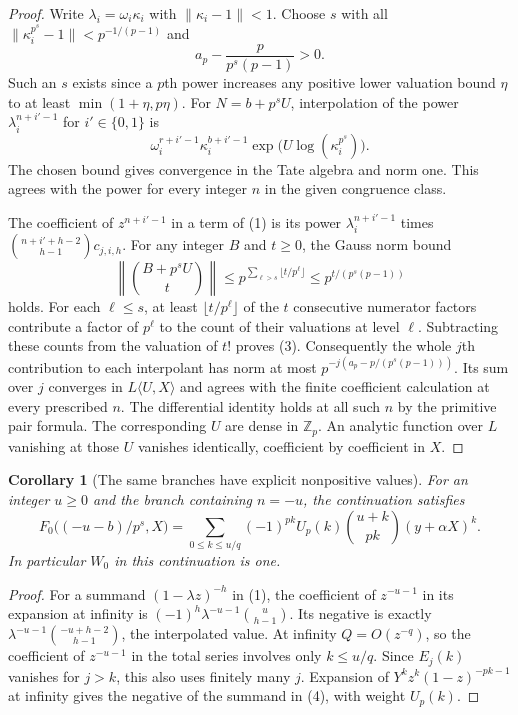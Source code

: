 \documentclass[11pt]{article}
\newtheorem{corollary}[theorem]{Corollary}
\begin{document}
\begin{proof}
Write $\lambda_i=\omega_i\kappa_i$ with $\|\kappa_i-1\|<1$.
Choose $s$ with all
$\|\kappa_i^{p^s}-1\|<p^{-1/(p-1)}$ and
\[
                  a_p-\frac{p}{p^s(p-1)}>0.
 \tag{2}
\]
Such an $s$ exists since a $p$th power increases any positive
lower valuation bound $\eta$ to at least $\min(1+\eta,p\eta)$.
For $N=b+p^sU$, interpolation of the power $\lambda_i^{n+i'-1}$
for $i'\in\{0,1\}$ is
\[
 \omega_i^{r+i'-1}\kappa_i^{b+i'-1}
             \exp\bigl(U\log(\kappa_i^{p^s})\bigr).
\]
The chosen bound gives convergence in the Tate algebra and
norm one. This agrees with the power for every integer $n$
in the given congruence class.

The coefficient of $z^{n+i'-1}$ in a term of (1) is its power
$\lambda_i^{n+i'-1}$ times
$\binom{n+i'+h-2}{h-1}c_{j,i,h}$.
For any integer $B$ and $t\ge0$, the Gauss norm bound
\[
 \left\|\binom{B+p^sU}{t}\right\|
 \le p^{\sum_{\ell>s}\lfloor t/p^\ell\rfloor}
 \le p^{t/(p^s(p-1))}
 \tag{3}
\]
holds. For each $\ell\le s$, at least $\lfloor t/p^\ell\rfloor$
of the $t$ consecutive numerator factors contribute a factor
of $p^\ell$ to the count of their valuations at level $\ell$.
Subtracting these counts from the valuation of $t!$ proves (3).
Consequently the whole $j$th contribution to each interpolant
has norm at most $p^{-j(a_p-p/(p^s(p-1)))}$.
Its sum over $j$ converges in $L\langle U,X\rangle$ and agrees
with the finite coefficient calculation at every prescribed $n$.
The differential identity holds at all such $n$ by the primitive
pair formula. The corresponding $U$ are dense in $\mathbb Z_p$.
An analytic function over $L$ vanishing at those $U$ vanishes
identically, coefficient by coefficient in $X$.
\end{proof}

\begin{corollary}[The same branches have explicit nonpositive values]
\label{cor:negative}
For an integer $u\ge0$ and the branch containing $n=-u$,
the continuation satisfies
\[
 F_0\bigl((-u-b)/p^s,X\bigr)=
 \sum_{0\le k\le u/q}(-1)^{pk}U_p(k)\binom{u+k}{pk}(y+\alpha X)^k .
 \tag{4}
\]
In particular $W_0$ in this continuation is one.
\end{corollary}
\begin{proof}
For a summand $(1-\lambda z)^{-h}$ in (1), the coefficient
of $z^{-u-1}$ in its expansion at infinity is
$(-1)^h\lambda^{-u-1}\binom{u}{h-1}$.
Its negative is exactly
$\lambda^{-u-1}\binom{-u+h-2}{h-1}$, the interpolated value.
At infinity $Q=O(z^{-q})$, so the coefficient of $z^{-u-1}$ in
the total series involves only $k\le u/q$. Since $E_j(k)$
vanishes for $j>k$, this also uses finitely many $j$.
Expansion of
$Y^k z^k(1-z)^{-pk-1}$ at infinity gives the negative of the
summand in (4), with weight $U_p(k)$.
\end{proof}
\end{document}
